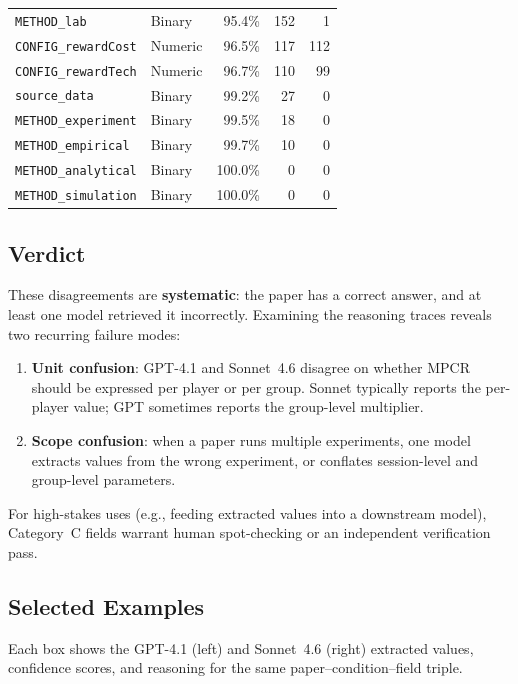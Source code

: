 \documentclass[11pt,a4paper]{article}
\begin{document}
\begin{center}
\begin{tabular}{llrrr}
\rowcolor{green!18}\texttt{METHOD\_lab} & Binary & 95.4\% & 152 & 1\\
\rowcolor{green!18}\texttt{CONFIG\_rewardCost} & Numeric & 96.5\% & 117 & 112\\
\rowcolor{green!18}\texttt{CONFIG\_rewardTech} & Numeric & 96.7\% & 110 & 99\\
\rowcolor{green!18}\texttt{source\_data} & Binary & 99.2\% & 27 & 0\\
\rowcolor{green!18}\texttt{METHOD\_experiment} & Binary & 99.5\% & 18 & 0\\
\rowcolor{green!18}\texttt{METHOD\_empirical} & Binary & 99.7\% & 10 & 0\\
\rowcolor{green!18}\texttt{METHOD\_analytical} & Binary & 100.0\% & 0 & 0\\
\rowcolor{green!18}\texttt{METHOD\_simulation} & Binary & 100.0\% & 0 & 0\\
\bottomrule
\end{tabular}
\end{center}

        \subsection{Verdict}
        These disagreements are \textbf{systematic}: the paper has a correct answer,
and at least one model retrieved it incorrectly.  Examining the reasoning
traces reveals two recurring failure modes:
\begin{enumerate}
  \item \textbf{Unit confusion}: GPT-4.1 and Sonnet~4.6 disagree on whether
    MPCR should be expressed per player or per group.  Sonnet typically
    reports the per-player value; GPT sometimes reports the group-level
    multiplier.
  \item \textbf{Scope confusion}: when a paper runs multiple experiments,
    one model extracts values from the wrong experiment, or conflates
    session-level and group-level parameters.
\end{enumerate}
For high-stakes uses (e.g., feeding extracted values into a downstream
model), Category~C fields warrant human spot-checking or an independent
verification pass.


        \subsection{Selected Examples}
        Each box shows the GPT-4.1 (left) and Sonnet~4.6 (right) extracted values,
        confidence scores, and reasoning for the same paper--condition--field triple.
\end{document}
